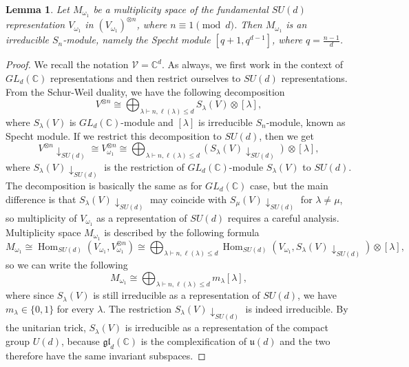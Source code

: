 \documentclass[10pt,twocolumn,superscriptaddress,aps,amsmath,amssymb,citeautoscript,floatfix,prx]{revtex4-2}
\theoremstyle{plain}
\theoremstyle{plain}
\theoremstyle{plain}
\theoremstyle{plain}
\theoremstyle{plain}
\theoremstyle{plain}
\newcommand{\C}{\mathbb{C}}
\theoremstyle{plain}
\newtheorem{smlemma}[smtheorem]{Lemma}
\theoremstyle{definition}
\theoremstyle{plain}
\begin{document}
\begin{appendix}
\begin{smlemma}\label{lem:M_module_irreducibility}
    Let $M_{\omega_1}$ be a multiplicity space of the fundamental $SU(d)$ representation $V_{\omega_1}$ in $\left(V_{\omega_1}\right)^{\otimes n}$, where $n\equiv 1 \pmod{d}$. 
    Then $M_{\omega_1}$ is an irreducible $S_n$-module, namely the Specht module $[q+1, q^{d-1}]$, where $q=\frac{n-1}{d}$.
\end{smlemma}

\begin{proof}
    We recall the notation $\mathcal{V}=\C^d$. As always, we first work in the context of $GL_d(\mathbb{C})$ representations and then restrict ourselves to $SU(d)$ representations. 
    From the Schur-Weil duality, we have the following decomposition
    \[
        V^{\otimes n} \cong \bigoplus_{\lambda \vdash n, \ell(\lambda) \leq d} S_\lambda(V) \otimes[\lambda],
    \]
    where $S_\lambda(V)$ is $GL_d(\mathbb{C})$-module and $[\lambda]$ is irreducible $S_n$-module, known as Specht module.
    If we restrict this decomposition to $SU(d)$, then we get
    \[
        V^{\otimes n}\downarrow_{SU(d)}\cong V_{\omega_1}^{\otimes n} \cong \bigoplus_{\lambda \vdash n, \ell(\lambda) \leq d}\left(S_\lambda(V) \downarrow_{S U(d)}\right) \otimes[\lambda],
    \]
    where $S_\lambda(V) \downarrow_{S U(d)}$ is the restriction of $GL_d(\mathbb{C})$-module $S_\lambda(V)$ to $SU(d)$. 
    The decomposition is basically the same as for $GL_d(\mathbb{C})$ case, but the main difference
    is that $S_\lambda(V) \downarrow_{S U(d)}$ may coincide with $S_\mu(V) \downarrow_{S U(d)}$ for $\lambda \neq \mu$, 
    so multiplicity of $V_{\omega_1}$ as a representation of $SU(d)$ requires a careful analysis.
    Multiplicity space $M_{\omega_1}$ is described by the following formula
    \[
        M_{\omega_1}\cong \operatorname{Hom}_{S U(d)}\left(V_{\omega_1}, V_{\omega_1}^{\otimes n}\right) 
        \cong \bigoplus_{\lambda \vdash n, \ell(\lambda) \leq d} \operatorname{Hom}_{S U(d)}\left(V_{\omega_1}, S_\lambda(V) \downarrow_{S U(d)}\right) \otimes[\lambda],
    \]
    so we can write the following
    \[
        M_{\omega_1} \cong \bigoplus_{\lambda \vdash n, \ell(\lambda) \leq d} m_\lambda[\lambda],
    \]
    where since $S_\lambda(V)$ is still irreducible as a representation of $SU(d)$, we have $m_{\lambda}\in \{0,1\}$ for every
    $\lambda$.
    The restriction $S_\lambda(V)\downarrow_{SU(d)}$ is indeed irreducible. By the unitarian trick, $S_\lambda(V)$ is irreducible as a representation 
    of the compact group $U(d)$, because $\mathfrak{gl}_d(\C)$ is the complexification of $\mathfrak u(d)$ and the two therefore have the same invariant subspaces. 

\end{proof}
\end{appendix}
\end{document}
